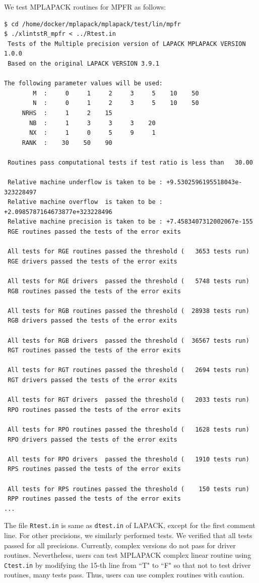 \documentclass[12pt]{article}
\begin{document}
We test MPLAPACK routines for MPFR as follows:
\begin{verbatim}
$ cd /home/docker/mplapack/mplapack/test/lin/mpfr
$ ./xlintstR_mpfr < ../Rtest.in
 Tests of the Multiple precision version of LAPACK MPLAPACK VERSION 1.0.0
 Based on the original LAPACK VERSION 3.9.1

The following parameter values will be used:
        M  :     0     1     2     3     5    10    50
        N  :     0     1     2     3     5    10    50
     NRHS  :     1     2    15
       NB  :     1     3     3     3    20
       NX  :     1     0     5     9     1
     RANK  :    30    50    90

 Routines pass computational tests if test ratio is less than   30.00

 Relative machine underflow is taken to be : +9.5302596195518043e-323228497
 Relative machine overflow  is taken to be : +2.0985787164673877e+323228496
 Relative machine precision is taken to be : +7.4583407312002067e-155
 RGE routines passed the tests of the error exits

 All tests for RGE routines passed the threshold (   3653 tests run)
 RGE drivers passed the tests of the error exits

 All tests for RGE drivers  passed the threshold (   5748 tests run)
 RGB routines passed the tests of the error exits

 All tests for RGB routines passed the threshold (  28938 tests run)
 RGB drivers passed the tests of the error exits

 All tests for RGB drivers  passed the threshold (  36567 tests run)
 RGT routines passed the tests of the error exits

 All tests for RGT routines passed the threshold (   2694 tests run)
 RGT drivers passed the tests of the error exits

 All tests for RGT drivers  passed the threshold (   2033 tests run)
 RPO routines passed the tests of the error exits

 All tests for RPO routines passed the threshold (   1628 tests run)
 RPO drivers passed the tests of the error exits

 All tests for RPO drivers  passed the threshold (   1910 tests run)
 RPS routines passed the tests of the error exits

 All tests for RPS routines passed the threshold (    150 tests run)
 RPP routines passed the tests of the error exits
...
\end{verbatim}
The file {\tt Rtest.in} is same as {\tt dtest.in} of LAPACK, except for the first comment line. 
For other precisions, we similarly performed tests. We verified that all tests passed for all precisions.
Currently, complex versions do not pass for driver routines. Nevertheless, users can test MPLAPACK complex linear routine using {\tt Ctest.in}  by modifying the 15-th line from ``T" to ``F" so that not to test driver routines, many tests pass. Thus, users can use complex routines with caution.
\end{document}
